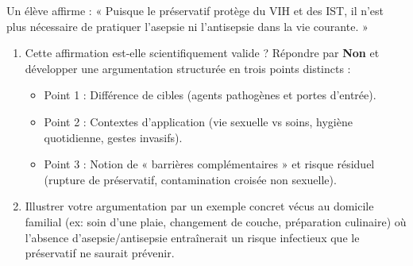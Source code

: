 \documentclass[11pt]{article}
\begin{document}
\begin{exercice}
Un élève affirme : « Puisque le préservatif protège du VIH et des IST, il n'est plus nécessaire de pratiquer l'asepsie ni l'antisepsie dans la vie courante. »
\begin{enumerate}
    \item Cette affirmation est-elle scientifiquement valide ? Répondre par \textbf{Non} et développer une argumentation structurée en trois points distincts :
    \begin{itemize}
        \item Point 1 : Différence de cibles (agents pathogènes et portes d'entrée).
        \item Point 2 : Contextes d'application (vie sexuelle vs soins, hygiène quotidienne, gestes invasifs).
        \item Point 3 : Notion de « barrières complémentaires » et risque résiduel (rupture de préservatif, contamination croisée non sexuelle).
    \end{itemize}
    \item Illustrer votre argumentation par un exemple concret vécus au domicile familial (ex: soin d'une plaie, changement de couche, préparation culinaire) où l'absence d'asepsie/antisepsie entraînerait un risque infectieux que le préservatif ne saurait prévenir.
\end{enumerate}
\end{exercice}
\end{document}
